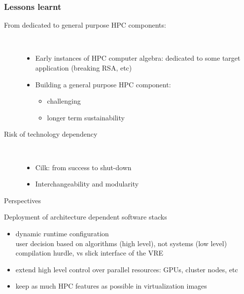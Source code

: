 \documentclass{beamer}
\newcommand{\thus}{\textcolor{red}{\MVRightarrow{}}\xspace}
\begin{document}
\begin{frame}
  \frametitle{Lessons learnt}

  \begin{description}
    \item[From dedicated to general purpose HPC components:]\
      \begin{itemize}
      \item  Early instances of HPC computer algebra: dedicated to some target
        application (breaking RSA, etc)
      \item Building a general purpose HPC component:
        \begin{itemize}
        \item challenging
        \item longer term sustainability
        \end{itemize}
      \end{itemize}
    \item[Risk of technology dependency]\
      \begin{itemize}
      \item Cilk: from success to shut-down
      \item Interchangeability and modularity
      \end{itemize}
      \end{description}
  \end{frame}
\begin{frame} {Perspectives}

  \begin{block}{ Deployment of architecture dependent software stacks}
    \begin{itemize}
    \item dynamic runtime configuration\\
      \thus user decision based on algorithms (high level), not systems (low level)
      \thus compilation hurdle, vs slick interface of the VRE 
    \item extend high level control over parallel resources: GPUs, cluster nodes, etc

    \item keep as much HPC features as possible in  virtualization images
    \end{itemize}
  \end{block}
\end{frame}

\end{document}
